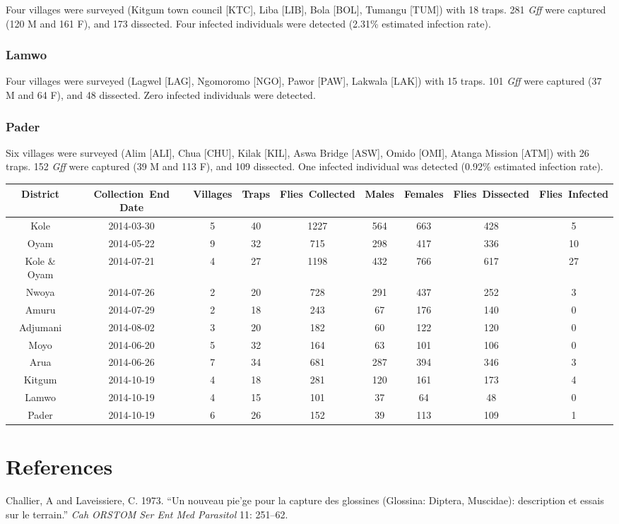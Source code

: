 \documentclass[letterpaper]{report}
\begin{document}
Four villages were surveyed (Kitgum town council {[}KTC{]}, Liba
{[}LIB{]}, Bola {[}BOL{]}, Tumangu {[}TUM{]}) with 18 traps. 281
\emph{Gff} were captured (120 M and 161 F), and 173 dissected. Four
infected individuals were detected (2.31\% estimated infection rate).

\subsubsection{Lamwo}\label{lamwo}

Four villages were surveyed (Lagwel {[}LAG{]}, Ngomoromo {[}NGO{]},
Pawor {[}PAW{]}, Lakwala {[}LAK{]}) with 15 traps. 101 \emph{Gff} were
captured (37 M and 64 F), and 48 dissected. Zero infected individuals
were detected.

\subsubsection{Pader}\label{pader}

Six villages were surveyed (Alim {[}ALI{]}, Chua {[}CHU{]}, Kilak
{[}KIL{]}, Aswa Bridge {[}ASW{]}, Omido {[}OMI{]}, Atanga Mission
{[}ATM{]}) with 26 traps. 152 \emph{Gff} were captured (39 M and 113 F),
and 109 dissected. One infected individual was detected (0.92\%
estimated infection rate).

\begin{longtable}[c]{@{}ccccccccc@{}}
\toprule
District & Collection~End Date & Villages & Traps & Flies~Collected &
Males & Females & Flies~Dissected & Flies~Infected\tabularnewline
\midrule
\endhead
Kole & 2014-03-30 & 5 & 40 & 1227 & 564 & 663 & 428 & 5\tabularnewline
Oyam & 2014-05-22 & 9 & 32 & 715 & 298 & 417 & 336 & 10\tabularnewline
Kole \& Oyam & 2014-07-21 & 4 & 27 & 1198 & 432 & 766 & 617 &
27\tabularnewline
Nwoya & 2014-07-26 & 2 & 20 & 728 & 291 & 437 & 252 & 3\tabularnewline
Amuru & 2014-07-29 & 2 & 18 & 243 & 67 & 176 & 140 & 0\tabularnewline
Adjumani & 2014-08-02 & 3 & 20 & 182 & 60 & 122 & 120 & 0\tabularnewline
Moyo & 2014-06-20 & 5 & 32 & 164 & 63 & 101 & 106 & 0\tabularnewline
Arua & 2014-06-26 & 7 & 34 & 681 & 287 & 394 & 346 & 3\tabularnewline
Kitgum & 2014-10-19 & 4 & 18 & 281 & 120 & 161 & 173 & 4\tabularnewline
Lamwo & 2014-10-19 & 4 & 15 & 101 & 37 & 64 & 48 & 0\tabularnewline
Pader & 2014-10-19 & 6 & 26 & 152 & 39 & 113 & 109 & 1\tabularnewline
\bottomrule
\end{longtable}

\section*{References}\label{references}

{Challier, A and Laveissiere}, C. 1973. ``Un nouveau pie'ge pour la
capture des glossines (Glossina: Diptera, Muscidae): description et
essais sur le terrain.'' \emph{Cah ORSTOM Ser Ent Med Parasitol} 11:
251--62.
\end{document}
